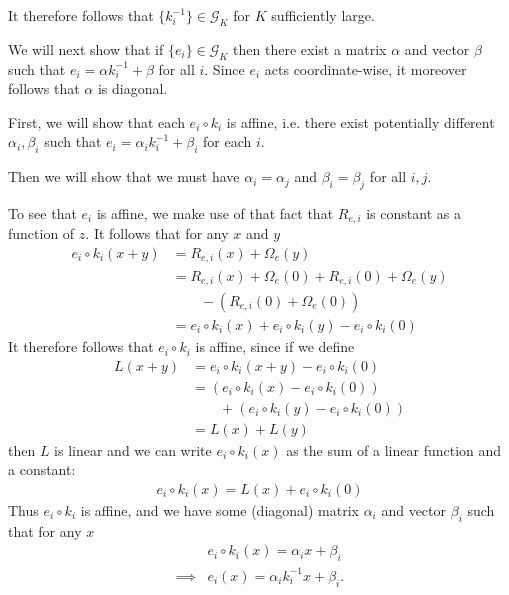 It therefore follows that $\{ {k}^{-1}_i \}  \in \mathcal{G}_K$ for $K$ sufficiently large.


We will next show that if $\{ {e}_i\} \in \mathcal{G}_K$ then there exist a matrix ${\alpha}$ and vector ${\beta}$ such that ${e}_i = {\alpha} {k}_i^{-1} + {\beta}$ for all $i$.
Since ${e}_i$ acts coordinate-wise, it moreover follows that ${\alpha}$ is diagonal.

First, we will show that each ${e}_i\circ{k}_i$ is affine, i.e. there exist potentially different ${\alpha}_i, {\beta}_i$ such that ${e}_i = {\alpha}_i {k}_i^{-1} + {\beta}_i$ for each $i$.

Then we will show that we must have ${\alpha}_i = {\alpha}_j$ and ${\beta}_i = {\beta}_j$ for all $i,j$.

To see that ${e}_i$ is affine, we make use of that fact that $R_{{e},i}$ is constant as a function of ${z}$.
It follows that for any $x$ and $y$
\begin{align*}
{e}_i\circ{k}_i(x + y) &= R_{{e},i}(x) + \Omega_{{e}}(y) \\
&= R_{{e},i}(x) + \Omega_{{e}}(0) + R_{{e},i}(0) + \Omega_{{e}}(y) \\
& \qquad- \left(R_{{e},i}(0) +  \Omega_{{e}}(0)\right) \\
&= {e}_i\circ{k}_i(x) + {e}_i\circ{k}_i(y) - {e}_i\circ{k}_i(0)
\end{align*}
It therefore follows that ${e}_i\circ{k}_i$ is affine, since if we define
\begin{align*}
L(x + y) &= {e}_i\circ{k}_i(x + y) - {e}_i\circ{k}_i(0) \\
&= \left({e}_i\circ{k}_i(x) - {e}_i\circ{k}_i(0)\right) \\
& \qquad+ \left({e}_i\circ{k}_i(y) - {e}_i\circ{k}_i(0)\right) \\
&= L(x) + L(y)
\end{align*}
then $L$ is linear and we can write ${e}_i\circ{k}_i(x)$ as the sum of a linear function and a constant:
\begin{align*}
{e}_i\circ{k}_i(x) = L(x) + {e}_i\circ{k}_i(0)
\end{align*}
Thus ${e}_i\circ{k}_i$ is affine, and we have some (diagonal) matrix ${\alpha}_i$ and vector ${\beta}_i$ such that for any $x$
\begin{align*}
&{e}_i\circ{k}_i(x) = {\alpha}_i x  + {\beta}_i \\
\implies& {e}_i \left(x \right) = {\alpha}_i {k}_i^{-1} x + {\beta}_i.
\end{align*}



